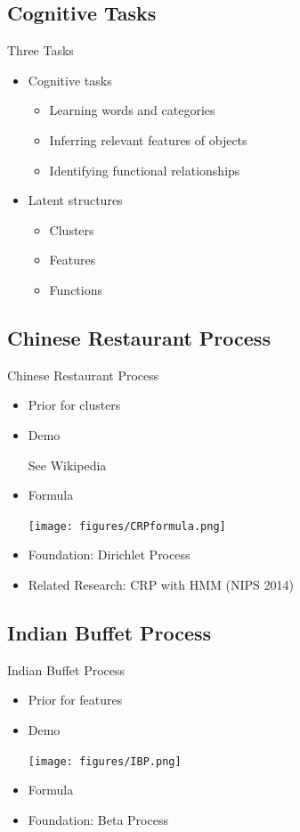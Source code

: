 \documentclass[handout]{beamer}
\begin{document}
\subsection{Cognitive Tasks}
\begin{frame}{Three Tasks}
\begin{itemize}
\item{Cognitive tasks}
	\begin{itemize}
	\item{Learning words and categories}
	\item{Inferring relevant features of objects}
	\item{Identifying functional relationships}
	\end{itemize}
\item{Latent structures}
	\begin{itemize}
	\item{Clusters}
	\item{Features}
	\item{Functions}
	\end{itemize}
\end{itemize}
\end{frame}



\subsection[CRP]{Chinese Restaurant Process}
\begin{frame}{Chinese Restaurant Process}
\begin{itemize}
\item{Prior for clusters}
\item{Demo}

See Wikipedia
\item{Formula}

\texttt{[image: figures/CRPformula.png]}
\item{Foundation: Dirichlet Process}
\item{Related Research: CRP with HMM (NIPS 2014)}
\end{itemize}
\end{frame}

\subsection[IBP]{Indian Buffet Process}
\begin{frame}{Indian Buffet Process}
\begin{itemize}
\item{Prior for features}
\item{Demo}

\texttt{[image: figures/IBP.png]}
\item{Formula}
\item{Foundation: Beta Process}
\end{itemize}
\end{frame}
\end{document}
